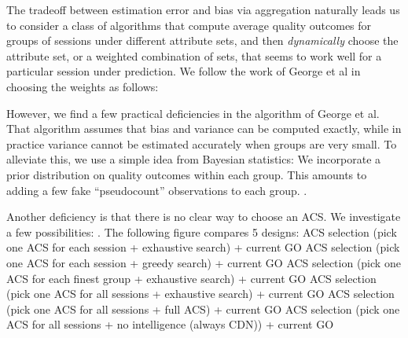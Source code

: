 \label{prediction}
The tradeoff between estimation error and bias via aggregation naturally leads us to consider a class of algorithms that compute average quality outcomes for groups of sessions under different attribute sets, and then {\it dynamically} choose the attribute set, or a weighted combination of sets, that seems to work well for a particular session under prediction.  We follow the work of George et al \cite{george2008value} in choosing the weights as follows:
\fillme

However, we find a few practical deficiencies in the algorithm of George et al.  That algorithm assumes that bias and variance can be computed exactly, while in practice variance cannot be estimated accurately when groups are very small.  To alleviate this, we use a simple idea from Bayesian statistics: We incorporate a prior distribution on quality outcomes within each group.  This amounts to adding a few fake ``pseudocount'' observations to each group.  \fillme.


Another deficiency is that there is no clear way to choose an ACS.  We investigate a few possibilities: \fillme . The following figure compares 5 designs:
ACS selection (pick one ACS for each session + exhaustive search) + current GO
ACS selection (pick one ACS for each session + greedy search) + current GO
ACS selection (pick one ACS for each finest group + exhaustive search) + current GO
ACS selection (pick one ACS for all sessions + exhaustive search) + current GO
ACS selection (pick one ACS for all sessions + full ACS) + current GO
ACS selection (pick one ACS for all sessions + no intelligence (always CDN)) + current GO



